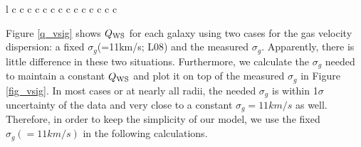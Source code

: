\documentclass[12pt,preprint]{aastex}
\begin{document}
\begin{deluxetable}{l c c c c c c c c c c c c c c}
\enddata
{}
\end{deluxetable}



Figure \ref{q_vsig} shows $Q_{\rm WS}$ for each galaxy using two cases for the gas velocity dispersion: a fixed $\sigma_g$(=11km/s; L08)  and the measured $\sigma_g$. Apparently, there is little difference in these two situations. Furthermore, we calculate the $\sigma_g$ needed to maintain a constant $Q_{\rm WS}$ and plot it on top of the measured $\sigma_g$ in Figure \ref{fig_vsig}. In most cases or at nearly all radii, the needed $\sigma_g$ is within 1$\sigma$ uncertainty of the data and very close to a constant $\sigma_g=11km/s$ as well. Therefore, in order to keep the simplicity of our model, we use the fixed $\sigma_g (=11km/s)$ in the following calculations.
\end{document}
